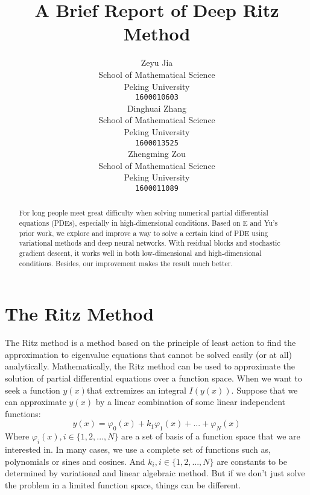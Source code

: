 \documentclass{article}
\title{A Brief Report of Deep Ritz Method}
\author{
  Zeyu Jia\\School of Mathematical Science\\Peking University\\ \texttt{1600010603} \\
  \And
  Dinghuai Zhang\\School of Mathematical Science\\Peking University\\ \texttt{1600013525}\\
  \And
  Zhengming Zou\\School of Mathematical Science\\Peking University \\ \texttt{1600011089}
}
\begin{document}

\maketitle

\begin{abstract}
For long people meet great difficulty when solving numerical partial differential equations (PDEs), especially in high-dimensional conditions. Based on E and Yu's prior work, we explore and improve a way to solve a certain kind of PDE using variational methods and deep neural networks. With residual blocks and stochastic gradient descent, it works well in both low-dimensional and high-dimensional conditions. Besides, our improvement makes the result much better.
\end{abstract}


\section{The Ritz Method}
\par The Ritz method is a method based on the principle of least action to find the approximation to eigenvalue equations that cannot be solved easily (or at all) analytically. Mathematically, the Ritz method can be used to approximate the solution of partial differential equations over a function space. When we want to seek a function $y(x)$that extremizes an integral $I(y(x))$. Suppose that we can approximate $y(x)$ by a linear combination of some linear independent  functions:
\begin{equation}
y(x)=\varphi_0(x)+k_1\varphi_1(x)+...+\varphi_N(x)
\end{equation}
Where $\varphi_{i}(x),i\in\{1,2,...,N\}$  are a set of basis of a function space that we are interested in. In many cases, we use a complete set of functions such as, polynomials or sines and cosines. And $k_i,i\in\{1,2,...,N\}$ are constants to be determined by variational and linear algebraic method. But if we don't just solve the problem in a limited function space, things can be different. 
\end{document}
